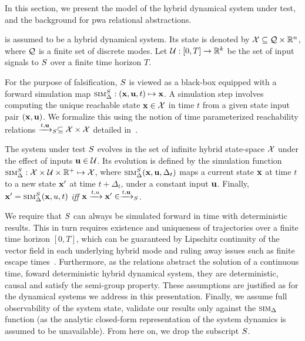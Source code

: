 In this section, we present the model of the hybrid dynamical system
under test, and the background for pwa relational abstractions.

 is assumed to be a hybrid
dynamical system. Its state is denoted by $\mathcal{X} \subseteq
\mathcal{Q} \times \mathbb{R}^n$, where $\mathcal{Q}$ is a finite set of discrete
modes. Let $\mathcal{U}: [0,T] \rightarrow \mathbb{R}^k$ be the set of input
signals to $S$ over a finite time horizon $T$.

For the purpose of falsification, $S$ is viewed as a black-box
equipped with a forward simulation map $\mbox{\sc sim}_\Delta^{S}:
(\mathbf{x}, \mathbf{u}, t) \mapsto \mathbf{x}$.  A simulation step
involves computing the unique reachable state $\mathbf{x} \in \mathcal{X}$ in time
$t$ from a given state input pair $(\mathbf{x},\mathbf{u})$.  We formalize this
using the notion of time parameterized reachability relations
$\xrightarrow{t, \mathbf{u}}_{S} \subseteq \mathcal{X} \times \mathcal{X}$
detailed in~\cite{zutshi2014multiple}.


\begin{definition}
    The system under test $S$ evolves in the set of infinite
    hybrid state-space $\mathcal{X}$ under the effect of inputs $\mathbf{u}
    \in \mathcal{U}$. Its evolution is defined by the simulation function
    $\mbox{\sc sim}_\Delta^{S} : \mathcal{X} \times \mathcal{U} \times \mathbb{R}^+ \mapsto
    \mathcal{X}$, where $\mbox{\sc sim}_\Delta^{S}(\mathbf{x},\mathbf{u},\Delta_t)$ maps a
    current state $\mathbf{x}$ at time $t$ to a new state $\mathbf{x}'$ at time
    $t+\Delta_t$, under a constant input $\mathbf{u}$.
    Finally, $\mathbf{x}'=\mbox{\sc sim}_\Delta^{S}(\mathbf{x},u,t)$ \emph{iff} $\mathbf{x}
    \xrightarrow{t,u} \mathbf{x}' \in \xrightarrow{t, \mathbf{u}}_{S}$.
\end{definition}

 We require that $S$ can always be
simulated forward in time with deterministic results. This in turn
requires existence and uniqueness of trajectories over a finite time
horizon $[0,T]$, which can be guaranteed by Lipschitz continuity of
the vector field in each underlying hybrid mode and ruling away issues
such as finite escape times~\cite{Meiss/2007/Differential}.
Furthermore, as the relations abstract the solution of a continuous
time, foward deterministic hybrid dynamical system, they are
deterministic, causal and satisfy the semi-group property.  These
assumptions are justified as for the dynamical systems we address in
this presentation. Finally, we assume full observability of the system
state, validate our results only against the $\mbox{\sc sim}_\Delta$ function (as
the analytic closed-form representation of the system dynamics is
assumed to be unavailable).  From here on, we drop the subscript
$S$.




